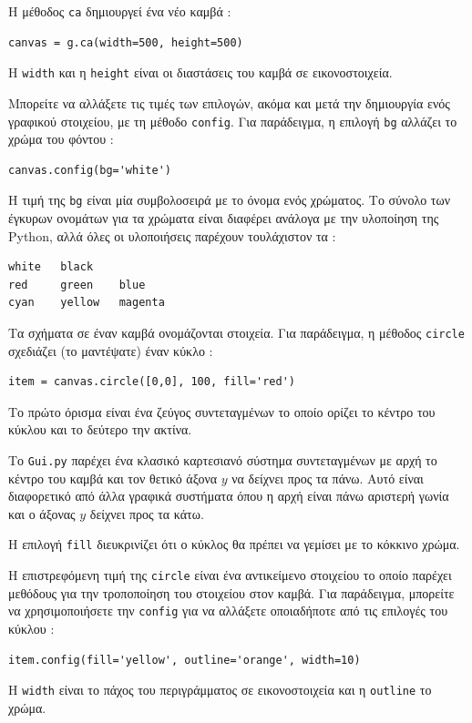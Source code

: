 \documentclass[10pt]{book}
\begin{document}
Η μέθοδος  {\tt ca}  δημιουργεί ένα νέο καμβά :

\begin{verbatim}
canvas = g.ca(width=500, height=500)
\end{verbatim}
%
 Η  {\tt width}  και η  {\tt height}  είναι οι διαστάσεις του καμβά σε 
εικονοστοιχεία.

Μπορείτε να αλλάξετε τις τιμές των επιλογών, ακόμα και μετά την δημιουργία ενός γραφικού στοιχείου, με τη μέθοδο  {\tt config}.   Για παράδειγμα, η επιλογή  {\tt bg}  
αλλάζει το χρώμα του φόντου :

\begin{verbatim}
canvas.config(bg='white')
\end{verbatim}
%
 Η τιμή της  {\tt bg}  είναι μία συμβολοσειρά με το όνομα ενός χρώματος.  
Το σύνολο των έγκυρων ονομάτων για τα χρώματα είναι διαφέρει ανάλογα με την υλοποίηση της 
 Python,  αλλά όλες οι υλοποιήσεις παρέχουν τουλάχιστον τα :

\begin{verbatim}
white   black
red     green    blue
cyan    yellow   magenta
\end{verbatim}
%
 Τα σχήματα σε έναν καμβά ονομάζονται στοιχεία.  Για παράδειγμα, η μέθοδος  
{\tt circle}  σχεδιάζει (το μαντέψατε) έναν κύκλο :

\begin{verbatim}
item = canvas.circle([0,0], 100, fill='red')
\end{verbatim}
%
 Το πρώτο όρισμα είναι ένα ζεύγος συντεταγμένων το οποίο ορίζει το κέντρο του κύκλου 
και το δεύτερο την ακτίνα.

Το  {\tt Gui.py}  παρέχει ένα κλασικό καρτεσιανό σύστημα συντεταγμένων με αρχή 
το κέντρο του καμβά και τον θετικό άξονα $y$ να δείχνει προς τα πάνω.  Αυτό είναι διαφορετικό από άλλα γραφικά συστήματα όπου η αρχή είναι πάνω αριστερή γωνία και ο άξονας $y$ δείχνει προς τα κάτω.

H επιλογή  {\tt fill}  διευκρινίζει ότι ο κύκλος θα πρέπει να γεμίσει με το 
κόκκινο χρώμα. 

Η επιστρεφόμενη τιμή της  {\tt circle}  είναι ένα αντικείμενο στοιχείου το οποίο 
παρέχει μεθόδους για την τροποποίηση του στοιχείου στον καμβά.  Για παράδειγμα, μπορείτε 
να χρησιμοποιήσετε την  {\tt config}  για να αλλάξετε οποιαδήποτε από τις επιλογές 
του κύκλου :

\begin{verbatim}
item.config(fill='yellow', outline='orange', width=10)
\end{verbatim}
%
 Η  {\tt width}  είναι το πάχος του περιγράμματος σε εικονοστοιχεία και η  
{\tt outline}  το χρώμα.
\end{document}

